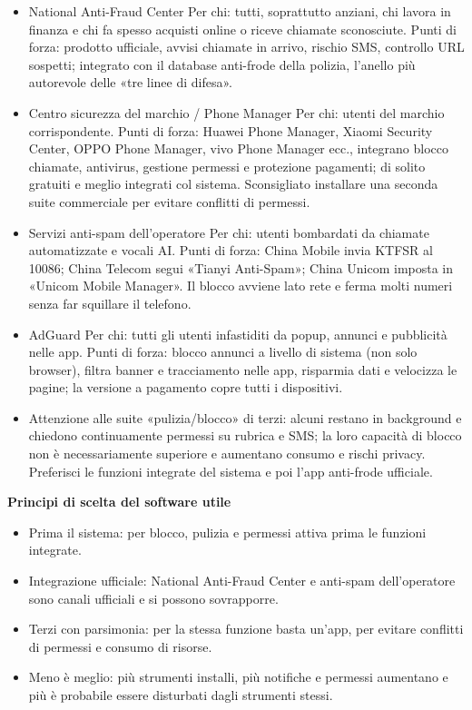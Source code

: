 
\begin{itemize}
  \item National Anti-Fraud Center Per chi: tutti, soprattutto anziani, chi lavora in finanza e chi fa spesso acquisti online o riceve chiamate sconosciute. Punti di forza: prodotto ufficiale, avvisi chiamate in arrivo, rischio SMS, controllo URL sospetti; integrato con il database anti-frode della polizia, l'anello più autorevole delle «tre linee di difesa».
  \item Centro sicurezza del marchio / Phone Manager Per chi: utenti del marchio corrispondente. Punti di forza: Huawei Phone Manager, Xiaomi Security Center, OPPO Phone Manager, vivo Phone Manager ecc., integrano blocco chiamate, antivirus, gestione permessi e protezione pagamenti; di solito gratuiti e meglio integrati col sistema. Sconsigliato installare una seconda suite commerciale per evitare conflitti di permessi.
  \item Servizi anti-spam dell'operatore Per chi: utenti bombardati da chiamate automatizzate e vocali AI. Punti di forza: China Mobile invia KTFSR al 10086; China Telecom segui «Tianyi Anti-Spam»; China Unicom imposta in «Unicom Mobile Manager». Il blocco avviene lato rete e ferma molti numeri senza far squillare il telefono.
  \item AdGuard Per chi: tutti gli utenti infastiditi da popup, annunci e pubblicità nelle app. Punti di forza: blocco annunci a livello di sistema (non solo browser), filtra banner e tracciamento nelle app, risparmia dati e velocizza le pagine; la versione a pagamento copre tutti i dispositivi.
  \item Attenzione alle suite «pulizia/blocco» di terzi: alcuni restano in background e chiedono continuamente permessi su rubrica e SMS; la loro capacità di blocco non è necessariamente superiore e aumentano consumo e rischi privacy. Preferisci le funzioni integrate del sistema e poi l'app anti-frode ufficiale.
\end{itemize}

\textbf{Principi di scelta del software utile}\par

\begin{itemize}
  \item Prima il sistema: per blocco, pulizia e permessi attiva prima le funzioni integrate.
  \item Integrazione ufficiale: National Anti-Fraud Center e anti-spam dell'operatore sono canali ufficiali e si possono sovrapporre.
  \item Terzi con parsimonia: per la stessa funzione basta un'app, per evitare conflitti di permessi e consumo di risorse.
  \item Meno è meglio: più strumenti installi, più notifiche e permessi aumentano e più è probabile essere disturbati dagli strumenti stessi.
\end{itemize}

